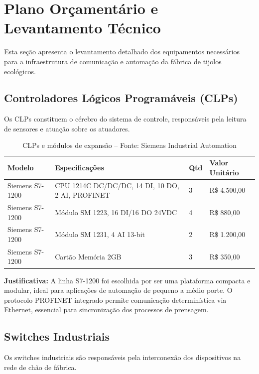 \documentclass[12pt,a4paper]{article}
\begin{document}
\section{Plano Orçamentário e Levantamento Técnico}

Esta seção apresenta o levantamento detalhado dos equipamentos necessários para a infraestrutura de comunicação e automação da fábrica de tijolos ecológicos.

\subsection{Controladores Lógicos Programáveis (CLPs)}

Os CLPs constituem o cérebro do sistema de controle, responsáveis pela leitura de sensores e atuação sobre os atuadores.

\begin{table}[h]
\centering
\begin{tabular}{@{}p{3cm}|p{5cm}|p{2cm}|p{3cm}@{}}
\toprule
\textbf{Modelo} & \textbf{Especificações} & \textbf{Qtd} & \textbf{Valor Unitário} \\
\midrule
Siemens S7-1200 & CPU 1214C DC/DC/DC, 14 DI, 10 DO, 2 AI, PROFINET & 3 & R\$ 4.500,00 \\
\midrule
Siemens S7-1200 & Módulo SM 1223, 16 DI/16 DO 24VDC & 4 & R\$ 880,00 \\
\midrule
Siemens S7-1200 & Módulo SM 1231, 4 AI 13-bit & 2 & R\$ 1.200,00 \\
\midrule
Siemens S7-1200 & Cartão Memória 2GB & 3 & R\$ 350,00 \\
\bottomrule
\end{tabular}
\caption{CLPs e módulos de expansão -- Fonte: Siemens Industrial Automation}
\end{table}

\textbf{Justificativa:} A linha S7-1200 foi escolhida por ser uma plataforma compacta e modular, ideal para aplicações de automação de pequeno a médio porte. O protocolo PROFINET integrado permite comunicação determinística via Ethernet, essencial para sincronização dos processos de prensagem.

\subsection{Switches Industriais}

Os switches industriais são responsáveis pela interconexão dos dispositivos na rede de chão de fábrica.
\end{document}
